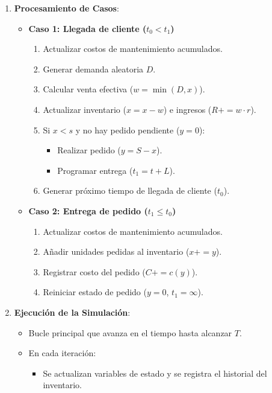 \documentclass[a4paper,12pt]{article}
\begin{document}
\begin{itemize}
\begin{enumerate}
    \item \textbf{Procesamiento de Casos}:
    \begin{itemize}
        \item \textbf{Caso 1: Llegada de cliente (\( t_0 < t_1 \))}
        \begin{enumerate}
            \item Actualizar costos de mantenimiento acumulados.
            \item Generar demanda aleatoria \( D \).
            \item Calcular venta efectiva (\( w = \min(D, x) \)).
            \item Actualizar inventario (\( x = x - w \)) e ingresos (\( R += w \cdot r \)).
            \item Si \( x < s \) y no hay pedido pendiente (\( y = 0 \)):
            \begin{itemize}
                \item Realizar pedido (\( y = S - x \)).
                \item Programar entrega (\( t_1 = t + L \)).
            \end{itemize}
            \item Generar próximo tiempo de llegada de cliente (\( t_0 \)).
        \end{enumerate}

        \item \textbf{Caso 2: Entrega de pedido (\( t_1 \leq t_0 \))}
        \begin{enumerate}
            \item Actualizar costos de mantenimiento acumulados.
            \item Añadir unidades pedidas al inventario (\( x += y \)).
            \item Registrar costo del pedido (\( C += c(y) \)).
            \item Reiniciar estado de pedido (\( y = 0 \), \( t_1 = \infty \)).
        \end{enumerate}
    \end{itemize}

    \item \textbf{Ejecución de la Simulación}:
    \begin{itemize}
        \item Bucle principal que avanza en el tiempo hasta alcanzar \( T \).
        \item En cada iteración:
        \begin{itemize}
            \item Se actualizan variables de estado y se registra el historial del inventario.
        \end{itemize}
    \end{itemize}


\end{enumerate}
\end{itemize}
\end{document}
